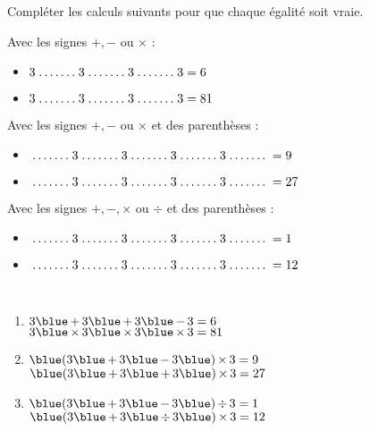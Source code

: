 \begin{exercice}%
   \newcommand{\pointillesNunExdix}{
      \makebox[0.1\linewidth]{\dotfill}
   }
   Compléter les calculs suivants pour que chaque égalité soit vraie.   
      \begin{enumerate}
         \begin{spacing}{1.5}
         \item Avec les signes $+, -$ ou $\times$ : 
         \begin{itemize}
            \item $3 \pointillesNunExdix 3 \pointillesNunExdix 3 \pointillesNunExdix 3 = 6$ 
            \item $3 \pointillesNunExdix 3 \pointillesNunExdix 3 \pointillesNunExdix 3 = 81$
         \end{itemize}
         \item Avec les signes $+, -$ ou $\times$ et des parenthèses : 
         \begin{itemize}
            \item $\pointillesNunExdix 3 \pointillesNunExdix 3 \pointillesNunExdix 3 \pointillesNunExdix 3 \pointillesNunExdix = 9$ 
            \item $\pointillesNunExdix 3 \pointillesNunExdix 3 \pointillesNunExdix 3 \pointillesNunExdix 3 \pointillesNunExdix = 27$ 
         \end{itemize}
         \item Avec les signes $+, -,\times$ ou $\div$ et des parenthèses :
         \begin{itemize}
            \item $\pointillesNunExdix 3 \pointillesNunExdix 3 \pointillesNunExdix 3 \pointillesNunExdix 3 \pointillesNunExdix = 1$ 
            \item $\pointillesNunExdix 3 \pointillesNunExdix 3 \pointillesNunExdix 3 \pointillesNunExdix 3 \pointillesNunExdix = 12$
         \end{itemize}
      \end{spacing}
      \end{enumerate}   
\end{exercice}

\begin{corrige}
   \ \\ [-5mm]
   \begin{enumerate}
      \item $3 {\blue \,+\,} 3 {\blue \,+\,} 3 {\blue \,-\,} 3 = 6$ \\
         $3 {\blue \,\times\,} 3  {\blue \,\times\,} 3  {\blue \,\times\,} 3 = 81$ \smallskip
      \item ${\blue (} 3 {\blue \,+\,} 3 {\blue \,-\,} 3 {\blue )\,\times\,} 3 = 9$ \\
         ${\blue (} 3 {\blue \,+\,} 3 {\blue \,+\,} 3 {\blue )\,\times\,} 3 = 27$ \smallskip
      \item ${\blue (} 3 {\blue \,+\,} 3 {\blue \,-\,} 3 {\blue )\,\div\,} 3 = 1$ \\
         ${\blue (} 3 {\blue \,+\,} 3 {\blue \,\div\,} 3 {\blue )\,\times\,} 3 = 12$
   \end{enumerate}
\end{corrige}